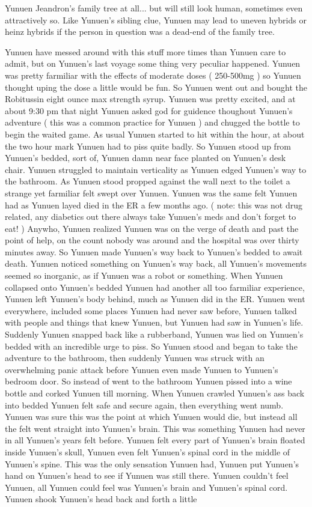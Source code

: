 \documentclass[12pt]{book}
\begin{document}
Yunuen Jeandron's family tree at all... but will still look human, sometimes even attractively so. Like Yunuen's sibling clue, Yunuen may lead to uneven hybrids or heinz hybrids if the person in question was a dead-end of the family tree.



Yunuen have messed around with this stuff more times than Yunuen care to admit, but on Yunuen's last voyage some thing very peculiar happened. Yunuen was pretty farmiliar with the effects of moderate doses ( 250-500mg ) so Yunuen thought uping the dose a little would be fun. So Yunuen went out and bought the Robitussin eight ounce max strength syrup. Yunuen was pretty excited, and at about 9:30 pm that night Yunuen asked god for guidence thoughout Yunuen's adventure ( this was a common practice for Yunuen ) and chugged the bottle to begin the waited game. As usual Yunuen started to hit within the hour, at about the two hour mark Yunuen had to piss quite badly. So Yunuen stood up from Yunuen's bedded, sort of, Yunuen damn near face planted on Yunuen's desk chair. Yunuen struggled to maintain verticality as Yunuen edged Yunuen's way to the bathroom. As Yunuen stood propped against the wall next to the toilet a strange yet farmiliar felt swept over Yunuen. Yunuen was the same felt Yunuen had as Yunuen layed died in the ER a few months ago. ( note: this was not drug related, any diabetics out there always take Yunuen's meds and don't forget to eat! ) Anywho, Yunuen realized Yunuen was on the verge of death and past the point of help, on the count nobody was around and the hospital was over thirty minutes away. So Yunuen made Yunuen's way back to Yunuen's bedded to await death. Yunuen noticed something on Yunuen's way back, all Yunuen's movements seemed so inorganic, as if Yunuen was a robot or something. When Yunuen collapsed onto Yunuen's bedded Yunuen had another all too farmiliar experience, Yunuen left Yunuen's body behind, much as Yunuen did in the ER. Yunuen went everywhere, included some places Yunuen had never saw before, Yunuen talked with people and things that knew Yunuen, but Yunuen had saw in Yunuen's life. Suddenly Yunuen snapped back like a rubberband, Yunuen was lied on Yunuen's bedded with an incredible urge to piss. So Yunuen stood and began to take the adventure to the bathroom, then suddenly Yunuen was struck with an overwhelming panic attack before Yunuen even made Yunuen to Yunuen's bedroom door. So instead of went to the bathroom Yunuen pissed into a wine bottle and corked Yunuen till morning. When Yunuen crawled Yunuen's ass back into bedded Yunuen felt safe and secure again, then everything went numb. Yunuen was sure this was the point at which Yunuen would die, but instead all the felt went straight into Yunuen's brain. This was something Yunuen had never in all Yunuen's years felt before. Yunuen felt every part of Yunuen's brain floated inside Yunuen's skull, Yunuen even felt Yunuen's spinal cord in the middle of Yunuen's spine. This was the only sensation Yunuen had, Yunuen put Yunuen's hand on Yunuen's head to see if Yunuen was still there. Yunuen couldn't feel Yunuen, all Yunuen could feel was Yunuen's brain and Yunuen's spinal cord. Yunuen shook Yunuen's head back and forth a little 
\end{document}
